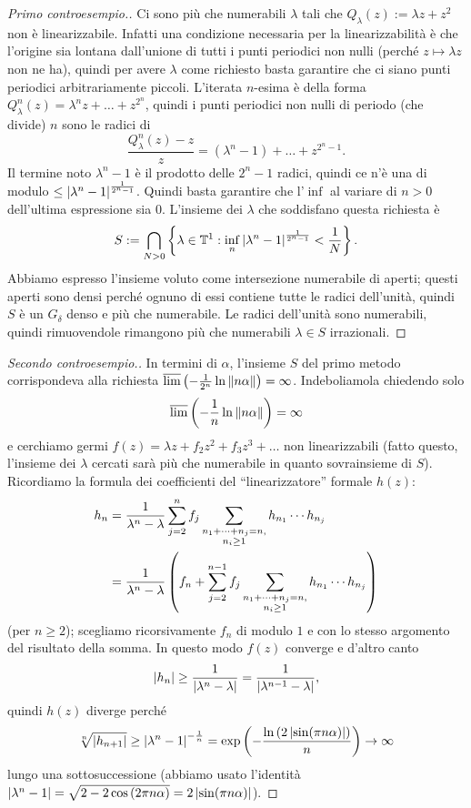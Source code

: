 \begin{proof}[Primo controesempio.]
Ci sono più che numerabili $\lambda$ tali che $Q_\lambda(z):=\lambda z+z^2$ non è linearizzabile.
Infatti una condizione necessaria per la linearizzabilità è che l'origine sia lontana dall'unione di tutti
i punti periodici non nulli (perché $z\mapsto \lambda z$ non ne ha), quindi per avere $\lambda$ come richiesto basta garantire che ci siano punti periodici arbitrariamente piccoli. L'iterata $n$-esima è della forma $Q_\lambda^n(z)=\lambda^n z+\dots+z^{2^n}$, quindi i punti periodici non nulli di periodo (che divide) $n$ sono le radici di
\[ \frac{Q_\lambda^n(z)-z}{z}=(\lambda^n-1)+\dots+z^{2^n-1}. \]
Il termine noto $\lambda^n-1$ è il prodotto delle $2^n-1$ radici, quindi ce n'è una di modulo $\le\left|\lambda^n-1\right|^{\frac{1}{2^n-1}}$.
Quindi basta garantire che l'$\inf$ al variare di $n>0$ dell'ultima espressione sia $0$.
L'insieme dei $\lambda$ che soddisfano questa richiesta è
\[ S:=\bigcap_{N>0}\left\{\lambda\in\mathbb{T}^1:\inf_n\left|\lambda^n-1\right|^{\frac{1}{2^n-1}}<\frac{1}{N}\right\}. \]
Abbiamo espresso l'insieme voluto come intersezione numerabile di aperti; questi aperti sono densi perché ognuno di essi contiene tutte le radici dell'unità, quindi $S$ è un $G_\delta$ denso e più che numerabile. Le radici dell'unità sono numerabili, quindi rimuovendole rimangono più che numerabili $\lambda\in S$ irrazionali.
\end{proof} 

\begin{proof}[Secondo controesempio.]
In termini di $\alpha$, l'insieme $S$ del primo metodo corrispondeva alla richiesta
$\overline{\lim}\left(-\frac{1}{2^n}\ln\left\|n\alpha\right\|\right)=\infty$. Indeboliamola chiedendo solo
\[ \overline{\lim}\left(-\frac{1}{n}\ln\left\|n\alpha\right\|\right)=\infty \]
e cerchiamo germi $f(z)=\lambda z+f_2 z^2+f_3 z^3+\dots$ non linearizzabili (fatto questo, l'insieme dei $\lambda$ cercati
sarà più che numerabile in quanto sovrainsieme di $S$).
Ricordiamo la formula dei coefficienti del ``linearizzatore'' formale $h(z)$:
\[ \begin{split} h_n&=\frac{1}{\lambda^n-\lambda}\sum_{j=2}^n f_j\sum_{\substack{n_1+\dots+n_j=n,\\n_i\ge 1}}h_{n_1}\cdots h_{n_j} \\
&=\frac{1}{\lambda^n-\lambda}\left(f_n+\sum_{j=2}^{n-1}f_j\sum_{\substack{n_1+\dots+n_j=n,\\n_i\ge 1}}h_{n_1}\cdots h_{n_j}\right) \end{split} \]
(per $n\ge 2$); scegliamo ricorsivamente $f_n$ di modulo $1$ e con lo stesso argomento del risultato della somma.
In questo modo $f(z)$ converge e d'altro canto
\[ \left|h_n\right|\ge\frac{1}{\left|\lambda^n-\lambda\right|}=\frac{1}{\left|\lambda^{n-1}-\lambda\right|}, \]
quindi $h(z)$ diverge perché
\[ \sqrt[n]{\left|h_{n+1}\right|}\ge\left|\lambda^n-1\right|^{-\frac{1}{n}}=\exp\left(-\frac{\ln\left(2\left|\sin(\pi n\alpha)\right|\right)}{n}\right)\to\infty \]
lungo una sottosuccessione (abbiamo usato l'identità $\left|\lambda^n-1\right|=\sqrt{2-2\cos\left(2\pi n\alpha\right)}=2\left|\sin(\pi n\alpha)\right|$).
\end{proof}

